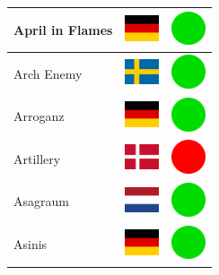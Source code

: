 \documentclass[12pt, a4paper, twoside]{report}
\begin{document}
\begin{center}
\begin{longtable}{|p{5cm}|p{2cm}|p{2cm}|}
April in Flames & \includegraphics[width=1cm]{4x3/de} & \includegraphics[width=1cm]{likes/y} \\ \hline
Arch Enemy & \includegraphics[width=1cm]{4x3/se} & \includegraphics[width=1cm]{likes/y} \\ \hline
Arroganz & \includegraphics[width=1cm]{4x3/de} & \includegraphics[width=1cm]{likes/y} \\ \hline
Artillery & \includegraphics[width=1cm]{4x3/dk} & \includegraphics[width=1cm]{likes/n} \\ \hline
Asagraum & \includegraphics[width=1cm]{4x3/nl} & \includegraphics[width=1cm]{likes/y} \\ \hline
Asinis & \includegraphics[width=1cm]{4x3/de} & \includegraphics[width=1cm]{likes/y} \\ \hline

\end{longtable}
\end{center}
\end{document}
